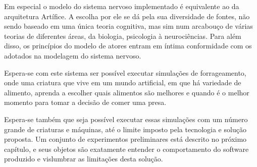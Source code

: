 Em especial o modelo do sistema nervoso implementado é equivalente ao da arquitetura Artífice. A escolha por ele se dá pela sua diversidade de fontes, não sendo baseado em uma única teoria cognitiva, mas sim num arcabouço de várias teorias de diferentes áreas, da biologia, psicologia à neurociências. Para além disso, os princípios do modelo de atores entram em íntima conformidade com os adotados na modelagem do sistema nervoso.

Espera-se com este sistema ser possível executar simulações de forrageamento, onde uma criatura que vive em um mundo artificial, em que há variedade de alimento, aprenda a escolher quais alimentos são melhores e quando é o melhor momento para tomar a decisão de comer uma presa.

Espera-se também que seja possível executar essas simulações com um número grande de criaturas e máquinas, até o limite imposto pela tecnologia e solução proposta. Um conjunto de experimentos preliminares está descrito no próximo capítulo, e seus objetos são exatamente entender o comportamento do software produzido e vislumbrar as limitações desta solução. 
